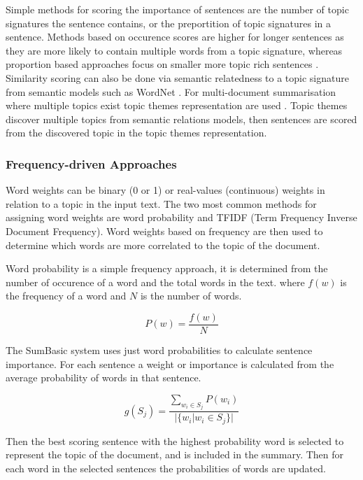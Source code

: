 Simple methods for scoring the importance of sentences are the number of topic signatures the sentence contains, or the preportition of topic signatures in a sentence. Methods based on occurence scores are higher for longer sentences as they are more likely to contain multiple words from a topic signature, whereas proportion based approaches focus on smaller more topic rich sentences \citep{allahyari2017text}. Similarity scoring can also be done via semantic relatedness to a topic signature from semantic models such as WordNet \citep{agirre2004approximating}. For multi-document summarisation where multiple topics exist topic themes representation are used \citep{harabagiu2005topic}. Topic themes discover multiple topics from semantic relations models, then sentences are scored from the discovered topic in the topic themes representation.

\subsubsection{Frequency-driven Approaches}
Word weights can be binary (0 or 1) or real-values (continuous) weights in relation to a topic in the input text. The two most common methods for assigning word weights are word probability and TFIDF (Term Frequency Inverse Document Frequency). Word weights based on frequency are then used to determine which words are more correlated to the topic of the document.

Word probability is a simple frequency approach, it is determined from the number of occurence of a word and the total words in the text. where $f(w)$ is the frequency of a word and $N$ is the number of words.

\begin{equation}
      P(w) = \frac{f(w)}{N}
      \label{wordProb}
\end{equation} 

The SumBasic system \citep{vanderwende2007beyond} uses just word probabilities to calculate sentence importance. For each sentence a weight or importance is calculated from the average probability of words in that sentence.

\begin{equation}
      g(S_j) = \frac{\sum_{w_i \in S_j} P(w_i)}{|\{w_i|w_i \in S_j \}|}
      \label{wordImport}
\end{equation}

Then the best scoring sentence with the highest probability word is selected to represent the topic of the document, and is included in the summary. Then for each word in the selected sentences the probabilities of words are updated.

